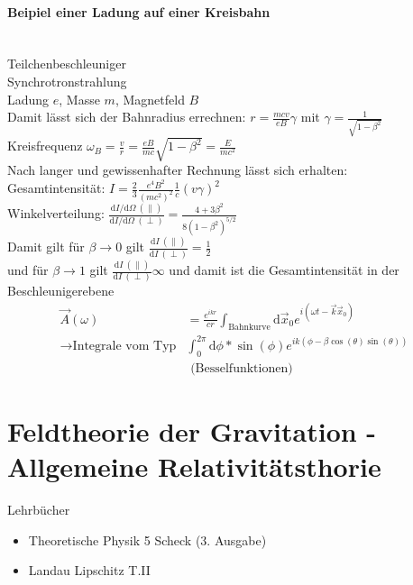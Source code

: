 \documentclass[a4paper]{article}
\begin{document}
\paragraph{Beipiel einer Ladung auf einer Kreisbahn}~\\
Teilchenbeschleuniger\\
Synchrotronstrahlung\\
Ladung $e$, Masse $m$, Magnetfeld $B$\\
Damit lässt sich der Bahnradius errechnen: $r=\frac{mcv}{eB}\gamma$ mit
$\gamma=\frac{1}{\sqrt{1-\beta^2}}$\\
Kreisfrequenz
$\omega_B=\frac{v}{r}=\frac{eB}{mc}\sqrt{1-\beta^2}=\frac{E}{mc^2}$\\
Nach langer und gewissenhafter Rechnung lässt sich erhalten:\\
Gesamtintensität: 
$I=\frac{2}{3}\frac{e^4B^2}{(mc^2)^2}\frac{1}{c}\left(v\gamma\right)^2$\\
Winkelverteilung: $\frac{\mathrm{d}I/\mathrm{d}\Omega\
(\parallel)}{\mathrm{d}I/\mathrm{d}\Omega\
(\perp)}=\frac{4+3\beta^2}{8(1-\beta^2)^{5/2}}$\\
Damit gilt für $\beta\rightarrow0$ gilt $\frac{\mathrm{d}I\
(\parallel)}{\mathrm{d}I \ (\perp)}=\frac{1}{2}$\\
und für $\beta\rightarrow1$ gilt $\frac{\mathrm{d}I\
(\parallel)}{\mathrm{d}I \ (\perp)}\infty$ und damit ist die Gesamtintensität in
der Beschleunigerebene
\begin{align}
\vec{A}(\omega)&=\frac{e^{ikr}}{cr}\int_{\text{Bahnkurve}}\mathrm{d}\vec{x}_0
e^{i(\omega t-\vec{k}\vec{x}_0)}\\
\rightarrow \text{Integrale vom Typ} &\int_0^{2\pi}\mathrm{d}\phi*\sin(\phi)
e^{ik(\phi-\beta \cos(\theta)\sin(\theta))}\\&\text{  (Besselfunktionen)}
\end{align}

\section{Feldtheorie der Gravitation - Allgemeine Relativitätsthorie}
Lehrbücher
\begin{itemize}
  \item Theoretische Physik 5 Scheck (3. Ausgabe)
  \item Landau Lipschitz T.II 
\end{itemize}
\end{document}
